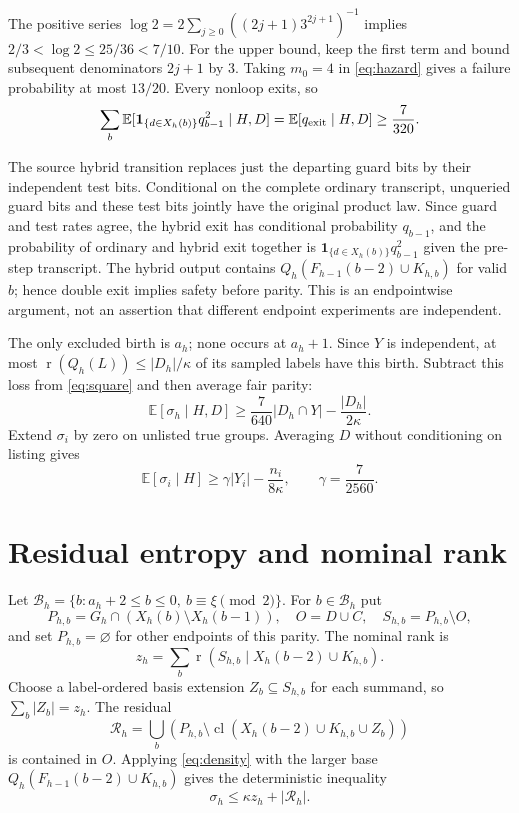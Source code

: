 \documentclass[11pt]{article}
\DeclareMathOperator{\cl}{cl}
\DeclareMathOperator{\rk}{r}
\newcommand{\E}{\mathbb E}
\newcommand{\one}{\mathbf 1}
\begin{document}
The positive series
$\log2=2\sum_{j\ge0}((2j+1)3^{2j+1})^{-1}$ implies
$2/3<\log2\le25/36<7/10$. For the upper bound, keep the first term
and bound subsequent denominators $2j+1$ by $3$.
Taking $m_0=4$ in \eqref{eq:hazard} gives a failure probability at most
$13/20$. Every nonloop exits, so
\begin{equation}\label{eq:square}
 \sum_b\E[\one_{\{d\in X_h(b)\}}q_{b-1}^2\mid H,D]
 =\E[q_{\rm exit}\mid H,D]\ge\frac7{320}.
\end{equation}

The source hybrid transition replaces just the departing guard bits
by their independent test bits. Conditional on the complete ordinary
transcript, unqueried guard bits and these test bits jointly have the
original product law. Since guard and test rates agree, the hybrid
exit has conditional probability $q_{b-1}$, and the probability of
ordinary and hybrid exit together is
$\one_{\{d\in X_h(b)\}}q_{b-1}^2$ given the pre-step transcript.
The hybrid output contains
$Q_h(F_{h-1}(b-2)\cup K_{h,b})$ for valid $b$; hence double exit
implies safety before parity. This is an endpointwise argument,
not an assertion that different endpoint experiments are independent.

The only excluded birth is $a_h$; none occurs at $a_h+1$.
Since $Y$ is independent, at most
$\rk(Q_h(L))\le |D_h|/\kappa$ of its sampled labels have this birth.
Subtract this loss from \eqref{eq:square} and then average fair parity:
\[
 \E[\sigma_h\mid H,D]
 \ge\frac7{640}|D_h\cap Y|-\frac{|D_h|}{2\kappa}.
\]
Extend $\sigma_i$ by zero on unlisted true groups. Averaging $D$ without
conditioning on listing gives
\begin{equation}\label{eq:sigma}
 \E[\sigma_i\mid H]\ge\gamma|Y_i|-\frac{n_i}{8\kappa},
 \qquad\gamma=\frac7{2560}.
\end{equation}

\section{Residual entropy and nominal rank}

Let $\mathcal B_h=\{b:a_h+2\le b\le0,\ b\equiv\xi\pmod2\}$.
For $b\in\mathcal B_h$ put
\[
 P_{h,b}=G_h\cap(X_h(b)\setminus X_h(b-1)),\quad O=D\cup C,
 \quad S_{h,b}=P_{h,b}\setminus O,
\]
and set $P_{h,b}=\varnothing$ for other endpoints of this parity.
The nominal rank is
\[
 z_h=\sum_b\rk(S_{h,b}\mid X_h(b-2)\cup K_{h,b}).
\]
Choose a label-ordered basis extension $Z_b\subseteq S_{h,b}$ for
each summand, so $\sum_b|Z_b|=z_h$. The residual
\[
 \mathcal R_h=\bigcup_b\left(P_{h,b}\setminus
  \cl(X_h(b-2)\cup K_{h,b}\cup Z_b)\right)
\]
is contained in $O$. Applying \eqref{eq:density} with the larger base
$Q_h(F_{h-1}(b-2)\cup K_{h,b})$ gives the deterministic inequality
\begin{equation}\label{eq:residual}
 \sigma_h\le\kappa z_h+|\mathcal R_h|.
\end{equation}
\end{document}
